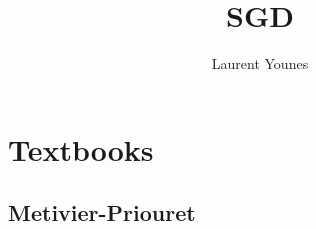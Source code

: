 \documentclass[12pt]{book}
\title{SGD}
\author{Laurent Younes}
\theoremstyle{break}
\renewcommand{\cite}{\citep}
\begin{document}
 

\maketitle

\section{Textbooks}

\subsection{Metivier-Priouret \cite{benveniste2012adaptive}}

%

\end{document}

